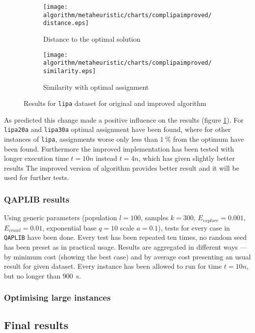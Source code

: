 \begin{figure}
  \centering

  \begin{subfigure}{0.9\textwidth}
    \texttt{[image: algorithm/metaheuristic/charts/complipaimproved/distance.eps]}
    \caption{Distance to the optimal solution}
  \end{subfigure}
  \begin{subfigure}{0.9\textwidth}
    \texttt{[image: algorithm/metaheuristic/charts/complipaimproved/similarity.eps]}
    \caption{Similarity with optimal assignment}
  \end{subfigure}
  
  \caption{Results for \texttt{lipa} dataset for original and improved algorithm}
  \label{figure:am_lipa_results_improved}
\end{figure}

As predicted this change made a positive influence on the results (figure \ref{figure:am_lipa_results_improved}). For \texttt{lipa20a} and \texttt{lipa30a} optimal assignment have been found, where for other instances of \texttt{lipa}, assignments worse only less than $1~\%$ from the optimum have been found. Furthermore the improved implementation has been tested with longer execution time $t=10n$ instead $t=4n$, which has given slightly better results The improved version of algorithm provides better result and it will be used for further tests.


\subsubsection{QAPLIB results}

Using generic parameters (population $l=100$, samples $k=300$, $E_{explore}=0.001$, $E_{crawl}=0.01$, exponential base $q=10$ scale $a=0.1$), tests for every case in \texttt{QAPLIB} have been done. Every test has been repeated ten times, no random seed has been preset as in practical usage. Results are aggregated in different ways --- by minimum cost (showing the best case) and by average cost presenting an usual result for given dataset. Every instance has been allowed to run for time $t=10n$, but no longer than 900~s.



\subsubsection{Optimising large instances}


\subsection{Final results}
